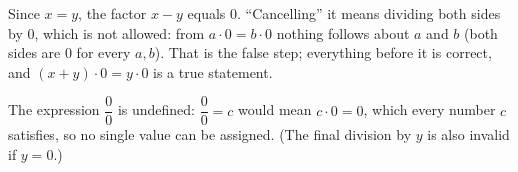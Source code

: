 Since $x=y$, the factor $x-y$ equals $0$. ``Cancelling'' it means dividing both sides by $0$, which is not allowed: from $a\cdot0=b\cdot0$ nothing follows about $a$ and $b$ (both sides are $0$ for every $a,b$). That is the false step; everything before it is correct, and $(x+y)\cdot0=y\cdot0$ is a true statement.

The expression $\dfrac{0}{0}$ is undefined: $\dfrac{0}{0}=c$ would mean $c\cdot0=0$, which every number $c$ satisfies, so no single value can be assigned. (The final division by $y$ is also invalid if $y=0$.)
